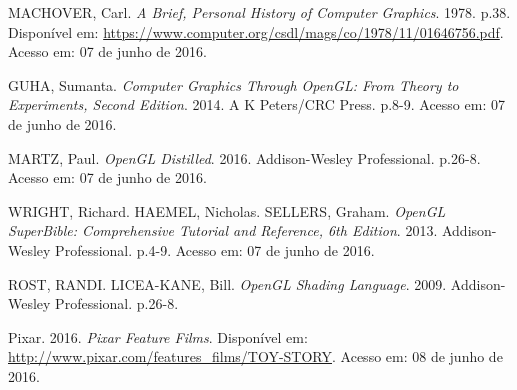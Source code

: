 \documentclass[brazil,ruledheader]{abntifes}
\begin{document}
\begin{thebibliography}{9}

%
%

MACHOVER, Carl. \textit{A Brief, Personal History of Computer Graphics}. 1978. p.38. Disponível em: \url{https://www.computer.org/csdl/mags/co/1978/11/01646756.pdf}.
Acesso em: 07 de junho de 2016.

GUHA, Sumanta. \textit{Computer Graphics Through OpenGL: From Theory to Experiments, Second Edition}. 2014. A K Peters/CRC Press. p.8-9.
Acesso em: 07 de junho de 2016.

MARTZ, Paul. \textit{OpenGL Distilled}. 2016. Addison-Wesley Professional. p.26-8.
Acesso em: 07 de junho de 2016.

WRIGHT, Richard. HAEMEL, Nicholas. SELLERS, Graham. \textit{OpenGL SuperBible: Comprehensive Tutorial and Reference, 6th Edition}. 2013. Addison-Wesley Professional. p.4-9.
Acesso em: 07 de junho de 2016.

ROST, RANDI. LICEA-KANE, Bill. \textit{OpenGL Shading Language}. 2009. Addison-Wesley Professional. p.26-8.

Pixar. 2016. \textit{Pixar Feature Films}. Disponível em: \url{http://www.pixar.com/features_films/TOY-STORY}.
Acesso em: 08 de junho de 2016.


\end{thebibliography}


\anexo
\end{document}
